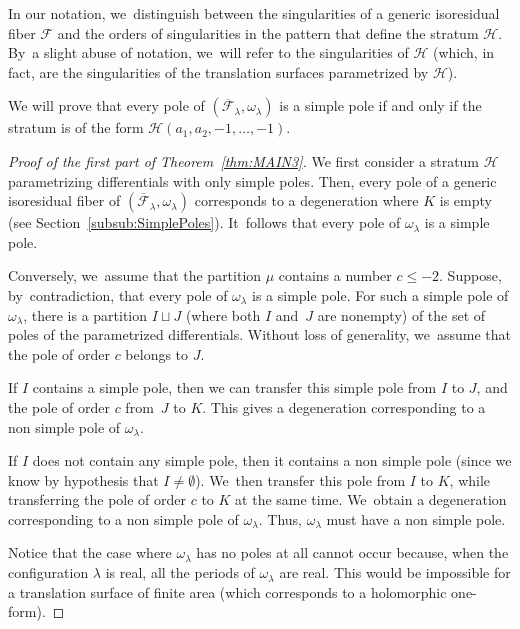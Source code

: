 In our notation, we~distinguish between the singularities of a generic isoresidual fiber $\mathcal{F}$ and the orders of singularities in the pattern that define the stratum $\mathcal{H}$. By~a slight abuse of notation, we~will refer to the singularities of $\mathcal{H}$ (which, in fact, are the singularities of the translation surfaces parametrized by $\mathcal{H}$).

\label{sub:7Simple}

We will prove that every pole of $(\overline{\mathcal{F}}_{\lambda},\omega_{\lambda})$ is a simple pole if and only if the stratum is of the form $\mathcal{H}(a_{1},a_{2},-1,\dots,-1)$.

\begin{proof}[Proof of the first part of Theorem~\ref{thm:MAIN3}]
We first consider a stratum $\mathcal{H}$ parametrizing differentials with only simple poles. Then, every pole of a generic isoresidual fiber of $(\overline{\mathcal{F}}_{\lambda},\omega_{\lambda})$ corresponds to a degeneration where $K$ is empty (see Section~\ref{subsub:SimplePoles}). It~follows that every pole of $\omega_{\lambda}$ is a simple pole.

Conversely, we~assume that the partition $\mu$ contains a number $c \leq -2$. Suppose, by~contradiction, that every pole of $\omega_{\lambda}$ is a simple pole. For such a simple pole of $\omega_{\lambda}$, there is a partition $I \sqcup J$ (where both $I$ and~$J$ are nonempty) of the set of poles of the parametrized differentials. Without loss of generality, we~assume that the pole of order $c$ belongs to $J$.

If $I$ contains a simple pole, then we can transfer this simple pole from $I$ to $J$, and the pole of order $c$ from~$J$ to $K$. This gives a degeneration corresponding to a non simple pole of $\omega_{\lambda}$.

If $I$ does not contain any simple pole, then it contains a non simple pole (since we know by hypothesis that $I \neq \emptyset$). We~then transfer this pole from $I$ to $K$, while transferring the pole of order $c$ to $K$ at the same time. We~obtain a degeneration corresponding to a non simple pole of $\omega_{\lambda}$. Thus, $\omega_{\lambda}$ must have a non simple pole.

Notice that the case where $\omega_{\lambda}$ has no poles at all cannot occur because, when the configuration $\lambda$ is real, all the periods of $\omega_{\lambda}$ are real. This would be impossible for a translation surface of finite area (which corresponds to a holomorphic one-form).
\end{proof}

